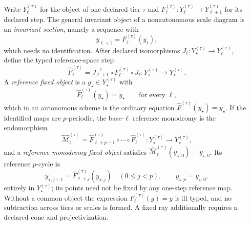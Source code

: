 Write $Y_\ell^{(\tau)}$ for the object of one declared tier $\tau$ and
$F_\ell^{(\tau)}:Y_\ell^{(\tau)}\to Y_{\ell+1}^{(\tau)}$ for its declared step.
The general invariant object of a nonautonomous scale diagram is an
\emph{invariant section}, namely a sequence with
\begin{equation}
y_{\ell+1}=F_\ell^{(\tau)}(y_\ell),
\label{eq:rg-invariant-section}
\end{equation}
which needs no identification.  After declared isomorphisms
$J_\ell:Y_\star^{(\tau)}\to Y_\ell^{(\tau)}$, define the typed reference-space
step
\begin{equation}
\widehat F_\ell^{(\tau)}
=J_{\ell+1}^{-1}\circ F_\ell^{(\tau)}\circ J_\ell
:Y_\star^{(\tau)}\longrightarrow Y_\star^{(\tau)}.
\label{eq:rg-reference-step}
\end{equation}
A \emph{reference fixed object} is a \(y_\star\in Y_\star^{(\tau)}\) with
\begin{equation}
\widehat F_\ell^{(\tau)}(y_\star)=y_\star
\qquad\text{for every }\ell,
\label{eq:rg-reference-fixed-object}
\end{equation}
which in an autonomous scheme is the ordinary equation
$\widehat F^{(\tau)}(y_\star)=y_\star$.  If the identified maps are
$p$-periodic, the base-$\ell$ reference monodromy is the endomorphism
\begin{equation}
\widehat{\mathcal M}_\ell^{(\tau)}
=\widehat F_{\ell+p-1}^{(\tau)}\circ\cdots\circ
\widehat F_\ell^{(\tau)}
:Y_\star^{(\tau)}\longrightarrow Y_\star^{(\tau)},
\label{eq:rg-monodromy-map}
\end{equation}
and a \emph{reference monodromy fixed object} satisfies
$\widehat{\mathcal M}_\ell^{(\tau)}(y_{\star,0})=y_{\star,0}$.  Its reference
\(p\)-cycle is
\[
y_{\star,j+1}
=\widehat F_{\ell+j}^{(\tau)}(y_{\star,j})
\quad(0\leq j<p),
\qquad
y_{\star,p}=y_{\star,0},
\]
entirely in \(Y_\star^{(\tau)}\); its points need not be fixed by any
one-step reference map.
Without a common object the expression $F_\ell^{(\tau)}(y)=y$ is ill typed, and
no subtraction across tiers or scales is formed.  A fixed ray additionally
requires a declared cone and projectivization. 

